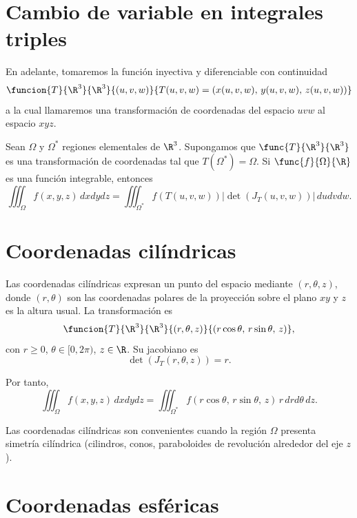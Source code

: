 \documentclass[a4,11pt]{aleph-notas}
\begin{document}
\encabezado

\section{Cambio de variable en integrales triples}

En adelante, tomaremos la función inyectiva y diferenciable con continuidad
\[
    \funcion{T}{\R^3}{\R^3}{(u,v,w)}{T(u,v,w)=(x(u,v,w),\,y(u,v,w),\,z(u,v,w))}
\]
a la cual llamaremos una transformación de coordenadas del espacio $uvw$ al espacio $xyz$.

\begin{prop}
    Sean $\Omega$ y $\Omega^*$ regiones elementales de $\R^3$. Supongamos que $\func{T}{\R^3}{\R^3}$ es una transformación de coordenadas tal que $T(\Omega^*)=\Omega$. Si $\func{f}{\Omega}{\R}$ es una función integrable, entonces
    \[
        \iiint_\Omega f(x,y,z)\, dxdydz = \iiint_{\Omega^*} f(T(u,v,w)) \left|\det(J_T(u,v,w))\right| \, dudvdw.
    \]
\end{prop}

\section{Coordenadas cilíndricas}

Las coordenadas cilíndricas expresan un punto del espacio mediante $(r,\theta,z)$, donde $(r,\theta)$ son las coordenadas polares de la proyección sobre el plano $xy$ y $z$ es la altura usual. La transformación es
\[
    \funcion{T}{\R^3}{\R^3}{(r,\theta,z)}{(r\cos\theta,\, r\sin\theta,\, z)},
\]
con $r\geq 0$, $\theta\in[0,2\pi)$, $z\in\R$. Su jacobiano es
\[
    \det(J_T(r,\theta,z)) = r.
\]

Por tanto,
\[
    \iiint_\Omega f(x,y,z)\, dxdydz = \iiint_{\Omega^*} f(r\cos\theta,\, r\sin\theta,\, z)\, r\, drd\theta\, dz.
\]

\begin{advertencia}
    Las coordenadas cilíndricas son convenientes cuando la región $\Omega$ presenta simetría cilíndrica (cilindros, conos, paraboloides de revolución alrededor del eje $z$).
\end{advertencia}

\section{Coordenadas esféricas}
\end{document}
